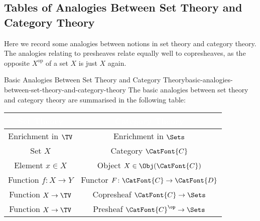 \subsection{Tables of Analogies Between Set Theory and Category Theory}\label{subsection-table-of-analogies-between-set-theory-and-category-theory}
Here we record some analogies between notions in set theory and category theory. The analogies relating to presheaves relate equally well to copresheaves, as the opposite $X^{\mathrm{op}}$ of a set $X$ is just $X$ again.
\begin{remark}{Basic Analogies Between Set Theory and Category Theory}{basic-analogies-between-set-theory-and-category-theory}%
    The basic analogies between set theory and category theory are summarised in the following table:
    \begingroup%
    \renewcommand{\arraystretch}{1.2}
    \begin{center}
        \begin{tabular}{|c|c|}\hline\rowcolor{darkRed}
            \textcolor{white}{\textbf{Set Theory}} & \textcolor{white}{\textbf{Category Theory}} \\\hline\rowcolor{backgroundColor}
            Enrichment in $\TV$                    & Enrichment in $\Sets$                       \\\rowcolor{black!05!backgroundColor}
            Set $X$                                & Category $\CatFont{C}$                      \\\rowcolor{backgroundColor}
            Element $x\in X$                       & Object $X\in\Obj(\CatFont{C})$              \\\rowcolor{black!05!backgroundColor}
            Function $f\colon X\to Y$              & Functor $F\colon\CatFont{C}\to\CatFont{D}$  \\\rowcolor{backgroundColor}
            Function $X\to\TV$                     & Copresheaf $\CatFont{C}\to\Sets$            \\\rowcolor{black!05!backgroundColor}
            Function $X\to\TV$                     & Presheaf $\CatFont{C}^{\op}\to\Sets$        \\\hline
        \end{tabular}
    \end{center}
    \endgroup
\end{remark}
